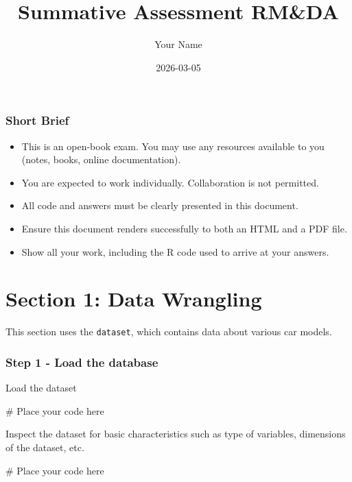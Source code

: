 \documentclass[
  letterpaper,
  DIV=11,
  numbers=noendperiod]{scrartcl}
\title{Summative Assessment RM\&DA}
\author{Your Name}
\date{2026-03-05}
\newenvironment{Shaded}{\begin{snugshade}}{\end{snugshade}}
\newcommand{\CommentTok}[1]{\textcolor[rgb]{0.37,0.37,0.37}{#1}}
\renewcommand*\contentsname{Table of contents}
\newcommand\contentsname{Table of contents}
\begin{document}
\maketitle

\renewcommand*\contentsname{Table of contents}
{
\hypersetup{linkcolor=}
\setcounter{tocdepth}{3}
\tableofcontents
}

\subsubsection{Short Brief}\label{short-brief}

\begin{itemize}
\item
  This is an open-book exam. You may use any resources available to you
  (notes, books, online documentation).
\item
  You are expected to work individually. Collaboration is not permitted.
\item
  All code and answers must be clearly presented in this document.
\item
  Ensure this document renders successfully to both an HTML and a PDF
  file.
\item
  Show all your work, including the R code used to arrive at your
  answers.
\end{itemize}

\section{Section 1: Data Wrangling}\label{section-1-data-wrangling}

This section uses the \texttt{dataset}, which contains data about
various car models.

\subsubsection{Step 1 - Load the
database}\label{step-1---load-the-database}

Load the dataset

\begin{Shaded}
\begin{Highlighting}[]
\CommentTok{\# Place your code here}
\end{Highlighting}
\end{Shaded}

Inspect the dataset for basic characteristics such as type of variables,
dimensions of the dataset, etc.

\begin{Shaded}
\begin{Highlighting}[]
\CommentTok{\# Place your code here}
\end{Highlighting}
\end{Shaded}
\end{document}
